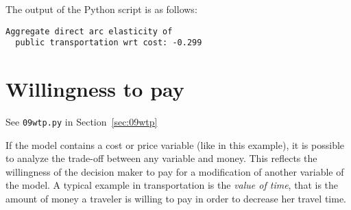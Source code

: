 \documentclass[12pt,a4paper]{article}
\begin{document}
The output of the Python script is as follows:
\begin{lstlisting}
Aggregate direct arc elasticity of
  public transportation wrt cost: -0.299
\end{lstlisting}

\section{Willingness to pay}

\begin{flushright}
See \lstinline$09wtp.py$ in Section~\ref{sec:09wtp}
\end{flushright}


If the model contains a cost or price variable (like in this example),
it is possible to analyze the trade-off between any variable and
money.  This reflects the willingness of the decision maker to pay for
a modification of another variable of the model.  A typical example in
transportation is the \emph{value of time}, that is the amount of
money a traveler is willing to pay in order to decrease her travel
time.
\end{document}

